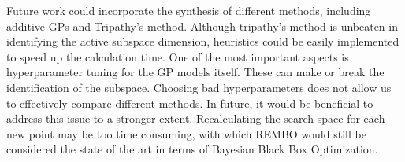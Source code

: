 Future work could incorporate the synthesis of different methods, including additive GPs and Tripathy's method.
Although tripathy's method is unbeaten in identifying the active subspace dimension, heuristics could be easily implemented to speed up the calculation time.
One of the most important aspects is hyperparameter tuning for the GP models itself.
These can make or break the identification of the subspace.
Choosing bad hyperparameters does not allow us to effectively compare different methods.
In future, it would be beneficial to address this issue to a stronger extent.
Recalculating the search space for each new point may be too time consuming, with which REMBO would still be considered the state of the art in terms of Bayesian Black Box Optimization.
 



